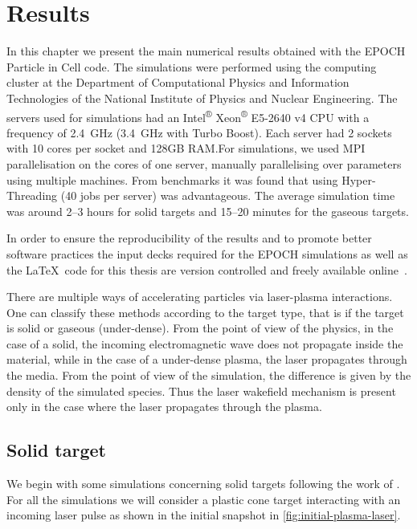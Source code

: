 \documentclass[12pt, class=report, crop=false]{standalone}
\begin{document}
\chapter{Results}%
\label{chap:results}

In this chapter we present the main numerical results obtained with the EPOCH
Particle in Cell code. The simulations were performed using the computing cluster
at the Department of Computational Physics and Information
Technologies of the National Institute of Physics and Nuclear Engineering.
The servers used for simulations had an Intel\textsuperscript{®} Xeon\textsuperscript{®}
E5-2640 v4 CPU with a frequency of \SI{2.4}{\giga\hertz} (\SI{3.4}{\giga\hertz}
with Turbo Boost). Each server had 2 sockets with 10 cores per socket and
128GB RAM.\@ For simulations, we used MPI parallelisation on the cores of one
server, manually parallelising over parameters using multiple machines.
From benchmarks it was found that using Hyper-Threading (40 jobs per server)
was advantageous. The average simulation time was around 2--3 hours for solid
targets and 15--20 minutes for the gaseous targets.

In order to ensure the reproducibility of the results and to promote better
software practices the input decks required for the EPOCH simulations
as well as the \LaTeX\ code for this thesis are version controlled and
freely available online~\autocite{micluta-campeanu_sebastianmcmasterthesis_2019}.

There are multiple ways of accelerating particles via laser-plasma interactions.
One can classify these methods according to the target type, that is if the
target is solid or gaseous (under-dense). From the point of view of the physics, in the
case of a solid, the incoming electromagnetic wave does not propagate inside
the material, while in the case of a under-dense plasma, the laser propagates
through the media. From the point of view of the simulation, the difference is
given by the density of the simulated species. Thus the laser wakefield mechanism
is present only in the case where the laser propagates through the plasma.

\section{Solid target}

We begin with some simulations concerning solid targets following the work of
\textcite{budriga_modelingultrahigh_2017}. For all the simulations we will consider
a plastic cone target interacting with an incoming laser pulse as shown in the
initial snapshot in \cref{fig:initial-plasma-laser}.
\end{document}
